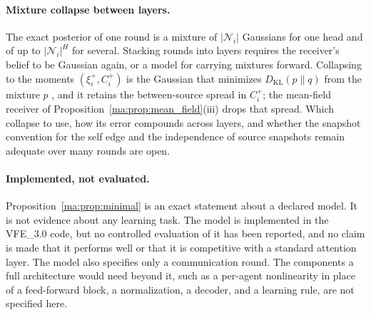 \documentclass[11pt]{article}
\theoremstyle{definition}
\theoremstyle{remark}
\providecommand{\KL}{D_{\mathrm{KL}}}
\newcommand{\Nset}{\mathcal N}
\begin{document}
\paragraph{Mixture collapse between layers.}
The exact posterior of one round is a mixture of $|\Nset_i|$ Gaussians for one head and of up to $|\Nset_i|^H$ for several. Stacking rounds into layers requires the receiver's belief to be Gaussian again, or a model for carrying mixtures forward. Collapsing to the moments $(\xi_i^+,C_i^+)$ is the Gaussian that minimizes $\KL(p\|q)$ from the mixture $p$ \citep[Sec.~10.7]{Bishop2006}, and it retains the between-source spread in $C_i^+$; the mean-field receiver of Proposition~\ref{ma:prop:mean_field}(iii) drops that spread. Which collapse to use, how its error compounds across layers, and whether the snapshot convention for the self edge and the independence of source snapshots remain adequate over many rounds are open.

\paragraph{Implemented, not evaluated.}
Proposition~\ref{ma:prop:minimal} is an exact statement about a declared model. It is not evidence about any learning task. The model is implemented in the VFE\_3.0 code, but no controlled evaluation of it has been reported, and no claim is made that it performs well or that it is competitive with a standard attention layer. The model also specifies only a communication round. The components a full architecture would need beyond it, such as a per-agent nonlinearity in place of a feed-forward block, a normalization, a decoder, and a learning rule, are not specified here.
\end{document}
